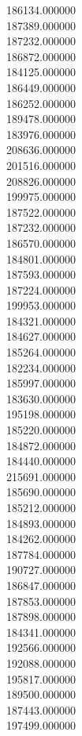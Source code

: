 186134.000000\\
187389.000000\\
187232.000000\\
186872.000000\\
184125.000000\\
186449.000000\\
186252.000000\\
189478.000000\\
183976.000000\\
208636.000000\\
201516.000000\\
208826.000000\\
199975.000000\\
187522.000000\\
187232.000000\\
186570.000000\\
184801.000000\\
187593.000000\\
187224.000000\\
199953.000000\\
184321.000000\\
184627.000000\\
185264.000000\\
182234.000000\\
185997.000000\\
183630.000000\\
195198.000000\\
185220.000000\\
184872.000000\\
184440.000000\\
215691.000000\\
185690.000000\\
185212.000000\\
184893.000000\\
184262.000000\\
187784.000000\\
190727.000000\\
186847.000000\\
187853.000000\\
187898.000000\\
184341.000000\\
192566.000000\\
192088.000000\\
195817.000000\\
189500.000000\\
187443.000000\\
197499.000000\\
